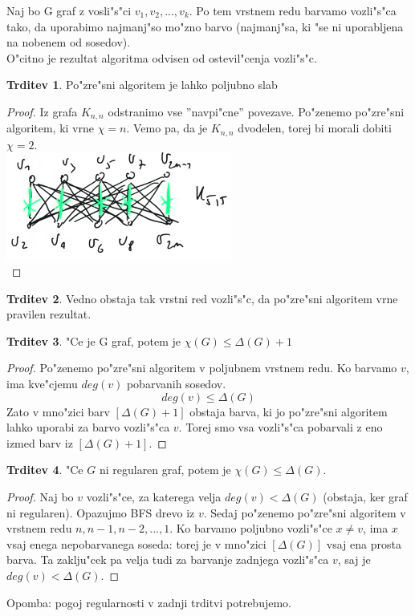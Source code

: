 \documentclass{article}
\theoremstyle{definition}
\newtheorem{claim}{Trditev}[section]
\begin{document}
	Naj bo G graf z vosli"s"ci $v_1,v_2,...,v_k$. Po tem vrstnem redu barvamo vozli"s"ca tako, da uporabimo najmanj"so mo"zno barvo (najmanj"sa, ki "se ni uporabljena na nobenem od sosedov).\\
	O"citno je rezultat algoritma odvisen od ostevil"cenja vozli"s"c.
	
	\begin{claim}
		Po"zre"sni algoritem je lahko poljubno slab
		\begin{proof}
			Iz grafa $K_{n,n}$ odstranimo vse ''navpi"cne'' povezave. Po"zenemo po"zre"sni algoritem, ki vrne $\chi=n$. Vemo pa, da je $K_{n,n}$ dvodelen, torej bi morali dobiti $\chi=2$.
			\\ \includegraphics{navpicne} \\
		\end{proof}
	\end{claim}
	\begin{claim}
		Vedno obstaja tak vrstni red vozli"s"c, da po"zre"sni algoritem vrne pravilen rezultat.
	\end{claim}

	\begin{claim}
		"Ce je G graf, potem je $\chi(G) \leq \Delta(G) + 1$
		\begin{proof}
			Po"zenemo po"zre"sni algoritem v poljubnem vrstnem redu. Ko barvamo $v$, ima kve"cjemu $deg(v)$ pobarvanih sosedov. $$deg(v) \leq \Delta(G)$$
			Zato v mno"zici barv $[\Delta(G)+1]$ obstaja barva, ki jo po"zre"sni algoritem lahko uporabi za barvo vozli"s"ca $v$. Torej smo vsa vozli"s"ca pobarvali z eno izmed barv iz $[\Delta(G)+1]$.
		\end{proof}
	\end{claim}

	\begin{claim}
		"Ce $G$ ni regularen graf, potem je $\chi(G) \leq \Delta(G)$.
		\begin{proof}
			Naj bo $v$ vozli"s"ce, za katerega velja $deg(v) < \Delta(G)$ (obstaja, ker graf ni regularen). Opazujmo BFS drevo iz $v$. Sedaj po"zenemo po"zre"sni algoritem v vrstnem redu $n, n-1, n-2, ..., 1$. Ko barvamo poljubno vozli"s"ce $x \neq v$, ima $x$ vsaj enega nepobarvanega soseda: torej je v mno"zici $[\Delta(G)]$ vsaj ena prosta barva. Ta zaklju"cek pa velja tudi za barvanje zadnjega vozli"s"ca $v$, saj je $deg(v) < \Delta(G)$.
		\end{proof}
	\end{claim}
	Opomba: pogoj regularnosti v zadnji trditvi potrebujemo.
	
\end{document}
